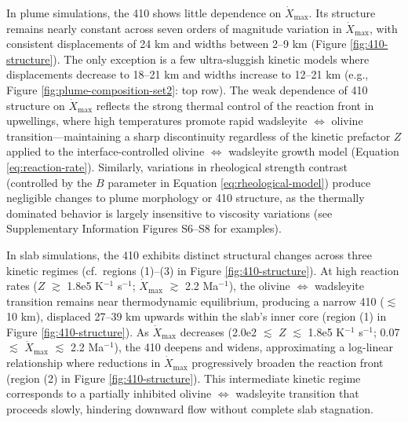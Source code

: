 \documentclass[draft,linenumbers]{agujournal2019}
\begin{document}
In plume simulations, the 410 shows little dependence on
\(\dot{X}_{\mathrm{max}}\). Its structure remains nearly constant across
seven orders of magnitude variation in \(\dot{X}_{\mathrm{max}}\), with
consistent displacements of 24 km and widths between 2--9 km (Figure
\ref{fig:410-structure}). The only exception is a few ultra-sluggish
kinetic models where displacements decrease to 18--21 km and widths
increase to 12--21 km (e.g., Figure \ref{fig:plume-composition-set2}:
top row). The weak dependence of 410 structure on
\(\dot{X}_{\mathrm{max}}\) reflects the strong thermal control of the
reaction front in upwellings, where high temperatures promote rapid
wadsleyite \(\Leftrightarrow\) olivine transition---maintaining a sharp
discontinuity regardless of the kinetic prefactor \(Z\) applied to the
interface-controlled olivine \(\Leftrightarrow\) wadsleyite growth model
(Equation \ref{eq:reaction-rate}). Similarly, variations in rheological
strength contrast (controlled by the \(B\) parameter in Equation
\ref{eq:rheological-model}) produce negligible changes to plume
morphology or 410 structure, as the thermally dominated behavior is
largely insensitive to viscosity variations (see Supplementary
Information Figures S6--S8 for examples).

In slab simulations, the 410 exhibits distinct structural changes across
three kinetic regimes (cf.~regions (1)--(3) in Figure
\ref{fig:410-structure}). At high reaction rates (\(Z\) \(\gtrsim\)
1.8e5 K\(^{-1}\) s\(^{-1}\); \(\dot{X}_{\mathrm{max}}\) \(\gtrsim\) 2.2
Ma\(^{-1}\)), the olivine \(\Leftrightarrow\) wadsleyite transition
remains near thermodynamic equilibrium, producing a narrow 410
(\(\lesssim\) 10 km), displaced 27--39 km upwards within the slab's
inner core (region (1) in Figure \ref{fig:410-structure}). As
\(\dot{X}_{\mathrm{max}}\) decreases (2.0e2 \(\lesssim\) \(Z\)
\(\lesssim\) 1.8e5 K\(^{-1}\) s\(^{-1}\); 0.07 \(\lesssim\)
\(\dot{X}_{\mathrm{max}}\) \(\lesssim\) 2.2 Ma\(^{-1}\)), the 410
deepens and widens, approximating a log-linear relationship where
reductions in \(\dot{X}_{\mathrm{max}}\) progressively broaden the
reaction front (region (2) in Figure \ref{fig:410-structure}). This
intermediate kinetic regime corresponds to a partially inhibited olivine
\(\Leftrightarrow\) wadsleyite transition that proceeds slowly,
hindering downward flow without complete slab stagnation.
\end{document}

